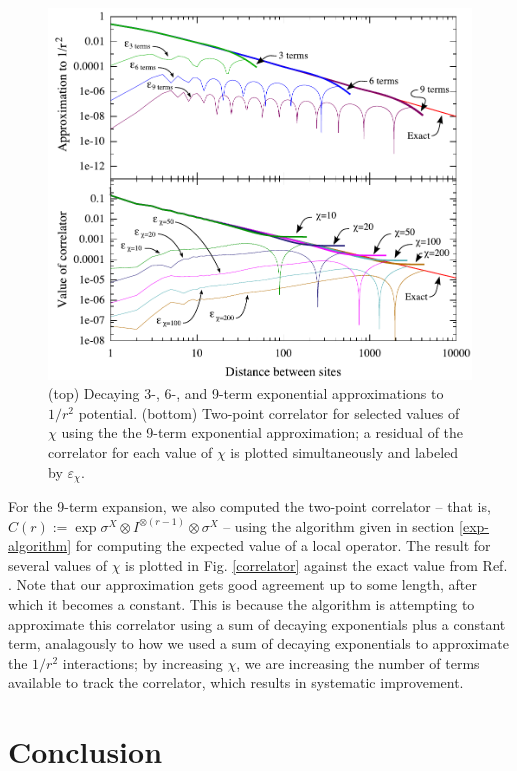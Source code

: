 \documentclass[12pt]{amsbook}
\theoremstyle{plain}
\theoremstyle{definition}
\theoremstyle{remark}
\begin{document}
\begin{figure}
\includegraphics[width=\columnwidth]{images/combined}
\caption{(top) Decaying 3-, 6-, and 9-term exponential approximations to $1/r^2$ potential.  (bottom) Two-point correlator for selected values of $\chi$ using the the 9-term exponential approximation;  a residual of the correlator for each value of $\chi$ is plotted simultaneously and labeled by $\varepsilon_\chi$.}
\label{correlator}
\label{expansion}
\end{figure}

For the 9-term expansion, we also computed the two-point correlator -- that is, $C(r):=\exp{\sigma^X \otimes I^{\otimes (r-1)}\otimes\sigma^X}$ -- using the algorithm given in section \ref{exp-algorithm} for computing the expected value of a local operator.  The result for several values of $\chi$ is plotted in Fig. \ref{correlator} against the exact value from Ref. \cite{PhysRevLett.60.639}.  Note that our approximation gets good agreement up to some length, after which it becomes a constant.  This is because the algorithm is attempting to approximate this correlator using a sum of decaying exponentials plus a constant term, analagously to how we used a sum of decaying exponentials to approximate the $1/r^2$ interactions;  by increasing $\chi$, we are increasing the number of terms available to track the correlator, which results in systematic improvement.
\section{Conclusion}
\end{document}
